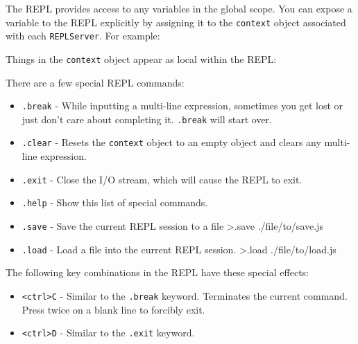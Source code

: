 The REPL provides access to any variables in the global scope. You can
expose a variable to the REPL explicitly by assigning it to the
\texttt{context} object associated with each \texttt{REPLServer}. For
example:

\begin{Shaded}
\begin{Highlighting}[]
 \NormalTok{),}
    \NormalTok{;}

 
\end{Highlighting}
\end{Shaded}

Things in the \texttt{context} object appear as local within the REPL:

\begin{Shaded}
\begin{Highlighting}[]
\end{Highlighting}
\end{Shaded}

There are a few special REPL commands:

\begin{itemize}
\item
  \texttt{.break} - While inputting a multi-line expression, sometimes
  you get lost or just don't care about completing it. \texttt{.break}
  will start over.
\item
  \texttt{.clear} - Resets the \texttt{context} object to an empty
  object and clears any multi-line expression.
\item
  \texttt{.exit} - Close the I/O stream, which will cause the REPL to
  exit.
\item
  \texttt{.help} - Show this list of special commands.
\item
  \texttt{.save} - Save the current REPL session to a file
  \textgreater{}.save ./file/to/save.js
\item
  \texttt{.load} - Load a file into the current REPL session.
  \textgreater{}.load ./file/to/load.js
\end{itemize}

The following key combinations in the REPL have these special effects:

\begin{itemize}
\item
  \texttt{\textless{}ctrl\textgreater{}C} - Similar to the
  \texttt{.break} keyword. Terminates the current command. Press twice
  on a blank line to forcibly exit.
\item
  \texttt{\textless{}ctrl\textgreater{}D} - Similar to the
  \texttt{.exit} keyword.
\end{itemize}
